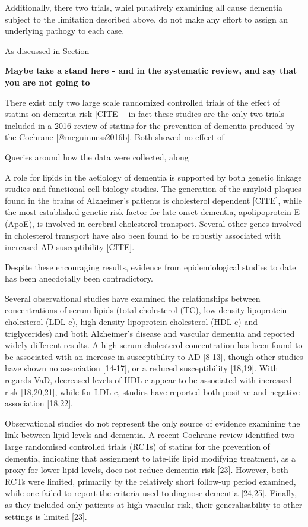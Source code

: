 \documentclass[a4paper,nobind]{templates/ociamthesis}
\begin{document}
Additionally, there two trials, whiel putatively examining all cause dementia subject to the limitation described above, do not make any effort to assign an underlying pathogy to each case.

As discussed in Section

\textbf{Maybe take a stand here - and in the systematic review, and say that you are not going to }

There exist only two large scale randomized controlled trials of the effect of statins on dementia risk {[}CITE{]} - in fact these studies are the only two trials included in a 2016 review of statins for the prevention of dementia produced by the Cochrane {[}@mcguinness2016b{]}. Both showed no effect of

Queries around how the data were collected, along

A role for lipids in the aetiology of dementia is supported by both genetic linkage studies and functional cell biology studies. The generation of the amyloid plaques found in the brains of Alzheimer's patients is cholesterol dependent {[}CITE{]}, while the most established genetic risk factor for late-onset dementia, apolipoprotein E (ApoE), is involved in cerebral cholesterol transport. Several other genes involved in cholesterol transport have also been found to be robustly associated with increased AD susceptibility {[}CITE{]}.

Despite these encouraging results, evidence from epidemiological studies to date has been anecdotally been contradictory.

Several observational studies have examined the relationships between concentrations of serum lipids (total cholesterol (TC), low density lipoprotein cholesterol (LDL-c), high density lipoprotein cholesterol (HDL-c) and triglycerides) and both Alzheimer's disease and vascular dementia and reported widely different results. A high serum cholesterol concentration has been found to be associated with an increase in susceptibility to AD {[}8-13{]}, though other studies have shown no association {[}14-17{]}, or a reduced susceptibility {[}18,19{]}. With regards VaD, decreased levels of HDL-c appear to be associated with increased risk {[}18,20,21{]}, while for LDL-c, studies have reported both positive and negative association {[}18,22{]}.

Observational studies do not represent the only source of evidence examining the link between lipid levels and dementia. A recent Cochrane review identified two large randomised controlled trials (RCTs) of statins for the prevention of dementia, indicating that assignment to late-life lipid modifying treatment, as a proxy for lower lipid levels, does not reduce dementia risk {[}23{]}. However, both RCTs were limited, primarily by the relatively short follow-up period examined, while one failed to report the criteria used to diagnose dementia {[}24,25{]}. Finally, as they included only patients at high vascular risk, their generalisability to other settings is limited {[}23{]}.
\end{document}

